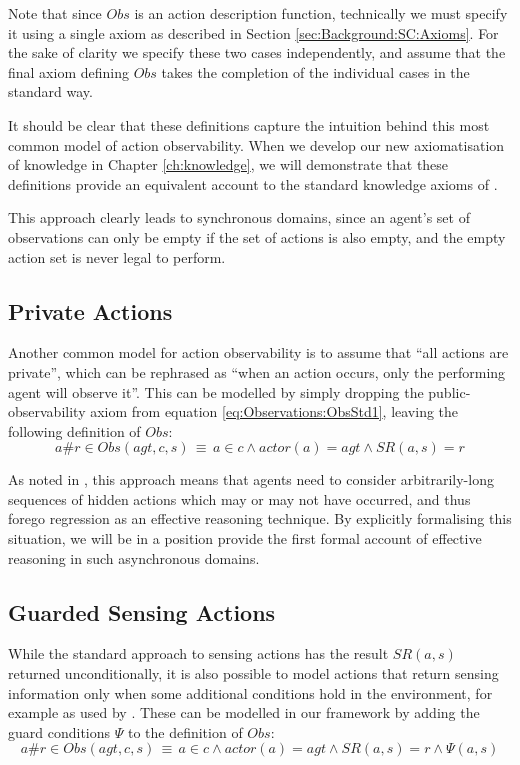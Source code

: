 Note that since $Obs$ is an action description function, technically
we must specify it using a single axiom as described in Section \ref{sec:Background:SC:Axioms}.
For the sake of clarity we specify these two cases independently,
and assume that the final axiom defining $Obs$ takes the completion
of the individual cases in the standard way.

It should be clear that these definitions capture the intuition behind
this most common model of action observability. When we develop our
new axiomatisation of knowledge in Chapter \ref{ch:knowledge}, we
will demonstrate that these definitions provide an equivalent account
to the standard knowledge axioms of \citet{scherl03sc_knowledge}.

This approach clearly leads to synchronous domains, since an agent's
set of observations can only be empty if the set of actions is also
empty, and the empty action set is never legal to perform.


\subsection{Private Actions}

Another common model for action observability is to assume that {}``all
actions are private'', which can be rephrased as {}``when an action
occurs, only the performing agent will observe it''. This can be
modelled by simply dropping the public-observability axiom from equation
\ref{eq:Observations:ObsStd1}, leaving the following definition of
$Obs$:\[
a\#r\in Obs(agt,c,s)\,\equiv\, a\in c\wedge actor(a)=agt\wedge SR(a,s)=r\]


As noted in \citep{Lesperance99sitcalc_approach}, this approach means
that agents need to consider arbitrarily-long sequences of hidden
actions which may or may not have occurred, and thus forego regression
as an effective reasoning technique. By explicitly formalising this
situation, we will be in a position provide the first formal account
of effective reasoning in such asynchronous domains.


\subsection{Guarded Sensing Actions\label{sec:Observations:Guarded-Sensing}}

While the standard approach to sensing actions has the result $SR(a,s)$
returned unconditionally, it is also possible to model actions that
return sensing information only when some additional conditions hold
in the environment, for example as used by \citet{Petrick06thesis}.
These can be modelled in our framework by adding the guard conditions
$\Psi$ to the definition of $Obs$:\[
a\#r\in Obs(agt,c,s)\,\equiv\, a\in c\wedge actor(a)=agt\wedge SR(a,s)=r\wedge\Psi(a,s)\]


